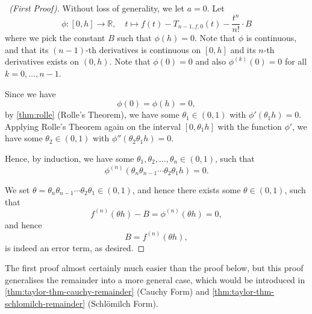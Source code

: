 \documentclass[11pt]{article}
\numberwithin{equation}{section}
\theoremstyle{definition}
\theoremstyle{remark}
\newcommand{\pqty}[1]{\left(#1\right)}
\newcommand{\ccintv}[2]{[#1,#2]}
\newcommand{\oointv}[2]{(#1,#2)}
\newcommand{\function}[5]{#1:#2\to #3,\quad #4\mapsto #5}
\newcommand{\RR}{\mathbb R}
\begin{document}
\begin{proof}[\proofname\ (First Proof)]
    Without loss of generality, we let \(a = 0\). Let
    \[
        \function{\phi}{\ccintv{0}{h}}{\RR}{t}{f\pqty{t} - T_{n - 1, f, 0} \pqty{t} - \frac{t^n}{n!} \cdot B}
    \]
    where we pick the constant \(B\) such that \(\phi\pqty{h} = 0\). Note that \(\phi\) is continuous, and that its \(\pqty{n - 1}\)-th derivatives is continuous on \(\ccintv{0}{h}\) and its \(n\)-th derivatives exists on \(\oointv{0}{h}\). Note that \(\phi\pqty{0} = 0\) and also \(\phi^{\pqty{k}} \pqty{0} = 0\) for all \(k = 0, \ldots, n - 1\).

    Since we have
    \[
        \phi\pqty{0} = \phi\pqty{h} = 0,
    \] 
    by \autoref{thm:rolle} (Rolle's Theorem), we have some \(\theta_1 \in \oointv{0}{1}\) with \(\phi'\pqty{\theta_1 h} = 0\). Applying Rolle's Theorem again on the interval \(\ccintv{0}{\theta_1 h}\) with the function \(\phi'\), we have some \(\theta_2 \in \oointv{0}{1}\) with \(\phi''\pqty{\theta_2 \theta_1 h} = 0\).

    Hence, by induction, we have some \(\theta_1, \theta_2, \ldots, \theta_n \in \oointv{0}{1}\), such that
    \[
        \phi^{\pqty{n}} \pqty{\theta_n \theta_{n - 1} \cdots \theta_{2} \theta_{1} h} = 0.
    \]

    We set \(\theta = \theta_n \theta_{n - 1} \cdots \theta_{2} \theta_{1} \in \oointv{0}{1}\), and hence there exists some \(\theta \in \oointv{0}{1}\), such that
    \[
        f^{\pqty{n}} \pqty{\theta h} - B = \phi^{\pqty{n}} \pqty{\theta h} = 0,
    \]
    and hence
    \[
        B = f^{\pqty{n}} \pqty{\theta h},
    \]
    is indeed an error term, as desired.
\end{proof}

The first proof almost certainly much easier than the proof below, but this proof generalises the remainder into a more general case, which would be introduced in \autoref{thm:taylor-thm-cauchy-remainder} (Cauchy Form) and \autoref{thm:taylor-thm-schlomilch-remainder} (Schl\"{o}milch Form).
\end{document}
